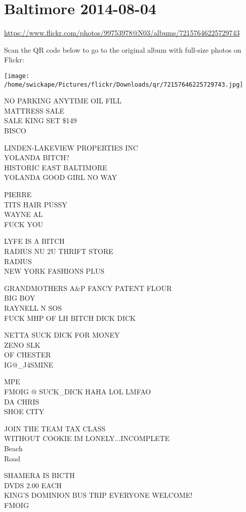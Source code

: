 \documentclass[10pt,letterpaper]{article}
\begin{document}
\section*{Baltimore 2014-08-04}

\url{https://www.flickr.com/photos/99753978@N03/albums/72157646225729743}

Scan the QR code below to go to the original album with full-size photos on Flickr:

\texttt{[image: /home/swickape/Pictures/flickr/Downloads/qr/72157646225729743.jpg]}


NO PARKING ANYTIME OIL FILL\\
MATTRESS SALE\\
SALE KING SET \$149\\
BISCO

LINDEN{-}LAKEVIEW PROPERTIES INC\\
YOLANDA BITCH?\\
HISTORIC EAST BALTIMORE\\
YOLANDA GOOD GIRL NO WAY

PIERRE\\
TITS HAIR PUSSY\\
WAYNE AL\\
FUCK YOU

LYFE IS A BITCH\\
RADIUS NU 2U THRIFT STORE\\
RADIUS\\
NEW YORK FASHIONS PLUS

GRANDMOTHERS A\&P FANCY PATENT FLOUR\\
BIG BOY\\
RAYNELL N SOS\\
FUCK MHP OF LH BITCH DICK DICK

NETTA SUCK DICK FOR MONEY\\
ZENO SLK\\
OF CHESTER\\
IG@\_J4SMINE

MPE\\
FMOIG @ SUCK\_DICK HAHA LOL LMFAO\\
DA CHRIS\\
SHOE CITY

JOIN THE TEAM TAX CLASS\\
WITHOUT COOKIE IM LONELY...INCOMPLETE\\
Beach\\
Road

SHAMERA IS BICTH\\
DVDS 2.00 EACH\\
KING'S DOMINION BUS TRIP EVERYONE WELCOME!\\
FMOIG
\end{document}
